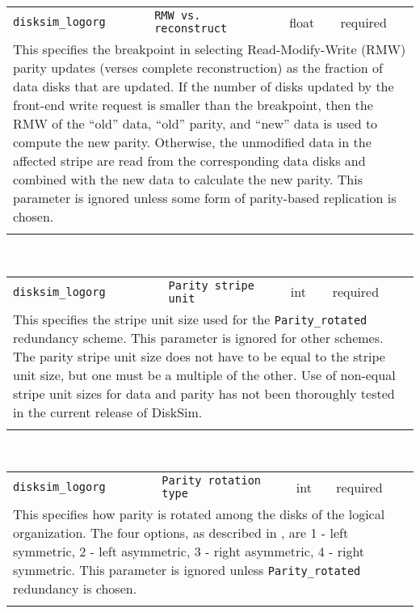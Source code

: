 \noindent 
\begin{tabular}{|p{1.5in}|p{3.5in}|p{0.5in}|p{0.5in}|}
\cline{1-4}
\texttt{disksim\_logorg} & \texttt{RMW vs. reconstruct} & float & required \\ 
\cline{1-4}
\multicolumn{4}{|p{6in}|}{
This specifies the breakpoint in selecting Read-Modify-Write (RMW) parity
updates (verses complete reconstruction) as the fraction of data disks
that are updated. If the number of disks updated by the front-end
write request is smaller than the breakpoint, then the RMW of the
``old'' data, ``old'' parity, and ``new'' data is used to compute the
new parity. Otherwise, the unmodified data in the affected stripe are
read from the corresponding data disks and combined with the new data
to calculate the new parity. This parameter is ignored unless some
form of parity-based replication is chosen.
}\\ 
\cline{1-4}
\multicolumn{4}{p{5in}}{}\\
\end{tabular}\\ 
\noindent 
\begin{tabular}{|p{1.5in}|p{3.5in}|p{0.5in}|p{0.5in}|}
\cline{1-4}
\texttt{disksim\_logorg} & \texttt{Parity stripe unit} & int & required \\ 
\cline{1-4}
\multicolumn{4}{|p{6in}|}{
This specifies the stripe unit size used for the \texttt{Parity\_rotated}
redundancy scheme. This parameter is ignored for other schemes. The
parity stripe unit size does not have to be equal to the stripe unit
size, but one must be a multiple of the other. Use of non-equal
stripe unit sizes for data and parity has not been thoroughly tested
in the current release of DiskSim.
}\\ 
\cline{1-4}
\multicolumn{4}{p{5in}}{}\\
\end{tabular}\\ 
\noindent 
\begin{tabular}{|p{1.5in}|p{3.5in}|p{0.5in}|p{0.5in}|}
\cline{1-4}
\texttt{disksim\_logorg} & \texttt{Parity rotation type} & int & required \\ 
\cline{1-4}
\multicolumn{4}{|p{6in}|}{
This specifies how parity is rotated
among the disks of the logical organization. The four options, as
described in \cite{Lee91}, are
1 - left symmetric,
2 - left asymmetric,
3 - right asymmetric,
4 - right symmetric.
This parameter is ignored unless \texttt{Parity\_rotated} redundancy is
chosen.
}\\ 
\cline{1-4}
\multicolumn{4}{p{5in}}{}\\
\end{tabular}\\ 
